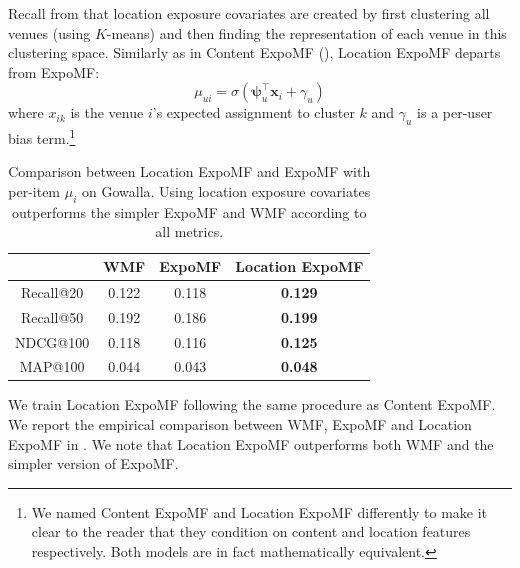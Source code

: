 Recall from  that location exposure covariates are created
by first clustering all venues (using $K$-means) and then finding the
representation of each venue in this clustering space. Similarly as in Content
ExpoMF (), Location ExpoMF departs from ExpoMF:
\begin{displaymath} \mu_{ui}= \sigma(\boldsymbol\psi_u^\top \mathbf{x}_i + \gamma_u)\end{displaymath}
where $x_{ik}$ is the venue $i$'s expected assignment to cluster $k$ and
$\gamma_u$ is a per-user bias term.\footnote{We named Content ExpoMF
and Location ExpoMF differently to make it clear to the reader that they
condition on content and location features respectively. Both models are
in fact mathematically equivalent.}

\begin{table}
\centering
\begin{tabular}{c c c c}
\hline
            & WMF & ExpoMF & Location ExpoMF \\ \hline
  Recall@20 & 0.122 & 0.118 & \textbf{0.129} \\
  Recall@50 & 0.192 & 0.186 & \textbf{0.199} \\
  NDCG@100  & 0.118 & 0.116 & \textbf{0.125} \\
  MAP@100   & 0.044 & 0.043 & \textbf{0.048} \\
\hline
\end{tabular}
\caption{Comparison between Location ExpoMF and ExpoMF with per-item
$\mu_i$ on Gowalla. Using location exposure covariates outperforms the
simpler ExpoMF and WMF according to all metrics.}
\label{tab:si_location_results}
\end{table}



 We train Location ExpoMF following the same procedure as
Content ExpoMF. We report the empirical comparison between WMF, ExpoMF and
Location ExpoMF in . We note that Location
ExpoMF outperforms both WMF and the simpler version of ExpoMF. 

